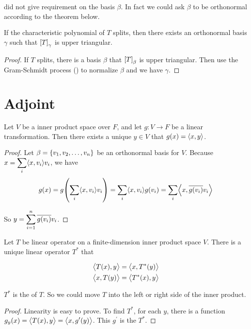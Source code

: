  did not give requirement on the basis $\beta$. In fact we could ask $\beta$ to be orthonormal according to the theorem below.

\begin{theorem}\label{schur_theorem}
    If the characteristic polynomial of $T$ splits, then there exists an orthonormal basis $\gamma$ such that $\coordinate{T}_\gamma$ is upper triangular.
\end{theorem}
\begin{proof}
    If $T$ splits, there is a basis $\beta$ that $\coordinate{T}_\beta$ is upper triangular. Then use the Gram-Schmidt process () to normalize $\beta$ and we have $\gamma$.
\end{proof}



\section{Adjoint}

\begin{theorem}\label{eiesz_representation_theorem}
Let $V$ be a inner product space over $F$, and let $g: V \rightarrow F$ be a linear transformation. Then there exists a unique $y \in V$ that $g(x) = \innerproduct{x}{y}$.
\end{theorem}
\begin{proof}
    Let $\beta = \set{v_1, v_2, \dots, v_n}$ be an orthonormal basis for $V$. Because $\displaystyle x = \sum_i \innerproduct{x}{v_i}v_i$, we have
    \begin{equation}
        g(x) = g\mleft(\sum_i \innerproduct{x}{v_i}v_i \mright) = \sum_i \innerproduct{x}{v_i}g(v_i) = \sum_i \innerproduct{x}{\conjugate{g(v_i)}v_i}
    \end{equation}
    
    So $\displaystyle y = \sum_{i=1}^n \overline{g(v_i)} v_i$.
\end{proof}


\begin{theorem}\label{adjoint_operator_definition}
    Let $T$ be linear operator on a finite-dimension inner product space $V$. There is a unique linear operator $T^*$ that
    
    \begin{equation}
        \begin{aligned}
            \innerproduct{T(x)}{y} &= \innerproduct{x}{T^* (y)} \\
            \innerproduct{x}{T(y)} &= \innerproduct{T^* (x)}{y}
        \end{aligned}
    \end{equation}
    
    
    $T^*$ is the  of $T$. So we could move $T$ into the left or right side of the inner product.
\end{theorem}
\begin{proof}
    Linearity is easy to prove. To find $T^*$, for each $y$, there is a function $g_y (x) = \innerproduct{T(x)}{y} = \innerproduct{x}{g^\prime (y)}$. This $g^\prime$ is the $T^*$.
\end{proof}


